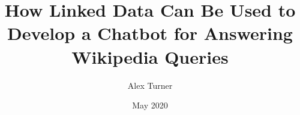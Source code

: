 \documentclass{surreydissertation}
\begin{document}
 

	\title{How Linked Data Can Be Used to \\ Develop a Chatbot for Answering Wikipedia Queries}
	\author{Alex Turner}
	\date{May 2020}
	
	\maketitle
	\setcounter{page}{1}
	
	
	

	\tableofcontents

	
	\listoffigures
	\listoftables
	
	
	\cleardoublepage
	\setcounter{page}{1}
	
	
	
	
	
	
	
	
	

	\appendix
	
	
	
	
	
	
	
\end{document}
